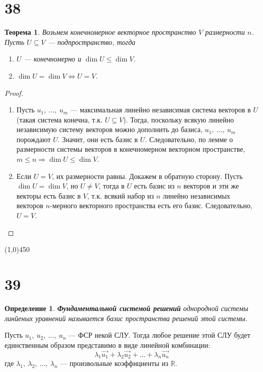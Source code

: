 \documentclass[a4paper,12pt]{article}
\newtheorem*{definition}{Определение}
\newtheorem*{theorem}{Теорема}
\begin{document}
	\section*{38}
	\begin{theorem}
		Возьмем конечномерное векторное пространство $V$ размерности $n$. Пусть $U \subseteq V$ --- подпространство, тогда 
		\begin{enumerate}
			\item $U$ --- конечномерно и $\dim U \le \dim V$.
			\item $\dim U = \dim V \iff U=V$.
		\end{enumerate}
	\end{theorem}  
	\begin{proof}
		\ 
		
		\begin{enumerate}
			\item Пусть $u_1,\ \ldots,\ u_m$ --- максимальная линейно независимая система векторов в $U$ (такая система конечна, т.к. $U \subseteq V$). Тогда, поскольку всякую линейно независимую систему векторов можно дополнить до базиса, $u_1,\ \ldots,\ u_m$ порождают $U$. Значит, они есть базис в $U$. Следовательно, по лемме о размерности системы векторов в конечномерном векторном пространстве, $m \leqslant n \Rightarrow \dim U \leqslant \dim V$.  
			\item Если $U=V$, их размерности равны. Докажем в обратную сторону. Пусть $\dim U=\dim V$, но $U\ne V$, тогда в $U$ есть базис из $n$ векторов и эти же векторы есть базис в $V$, т.к. всякий набор из $n$ линейно независимых векторов $n$-мерного векторного пространства есть его базис. Следовательно, $U=V$.
		\end{enumerate}
	\end{proof}
	\begin{center}
		\line(1,0){450}
	\end{center}
	\section*{39}
	\begin{definition}
		\textbf{Фундаментальной системой решений} однородной системы линйеных уравнений называется базис пространства решений этой системы.
	\end{definition}
	Пусть $u_1,\ u_2,\ \ldots ,\ u_n$ --- ФСР некой СЛУ. Тогда любое решение этой СЛУ будет единственным образом представимо в виде линейной комбинации:
	\[
	\lambda_1\vec{u_1} + \lambda_2\vec{u_2} + \ldots + \lambda_n\vec{u_n}
	\]
	где $\lambda_1,\ \lambda_2,\ \ldots ,\ \lambda_n$ --- произвольные коэффициенты из $\mathbb{R}$.
	
\end{document}
